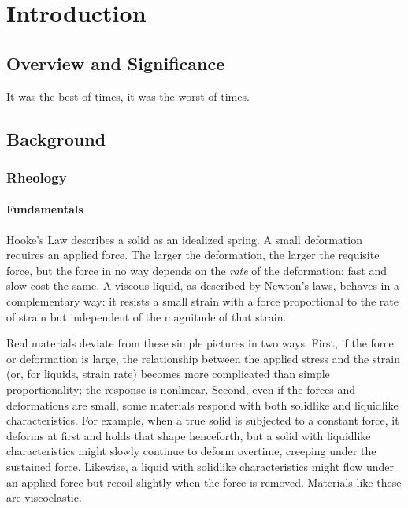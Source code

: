 \chapter{Introduction}

\section{Overview and Significance}

It was the best of times, it was the worst of times.

\section{Background}

\subsection{Rheology}

\subsubsection{Fundamentals}

Hooke's Law describes a solid as an idealized spring. A small deformation requires an applied force. The larger the deformation, the larger the requisite force, but the force in no way depends on the \emph{rate} of the deformation: fast and slow cost the same. A viscous liquid, as described by Newton's laws, behaves in a complementary way: it resists a small strain with a force proportional to the rate of strain but independent of the magnitude of that strain.

Real materials deviate from these simple pictures in two ways. First, if the force or deformation is large, the relationship between the applied stress and the strain (or, for liquids, strain rate) becomes more complicated than simple proportionality; the response is nonlinear. Second, even if the forces and deformations are small, some materials respond with both solidlike and liquidlike characteristics. For example, when a true solid is subjected to a constant force, it deforms at first and holds that shape henceforth, but a solid with liquidlike characteristics might slowly continue to deform overtime, creeping under the sustained force. Likewise, a liquid with solidlike characteristics might flow under an applied force but recoil slightly when the force is removed. Materials like these are viscoelastic.\cite{Ferry1980}

